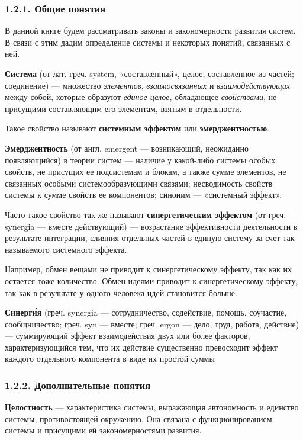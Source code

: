\documentclass[11pt,a4paper]{article}
\begin{document}
\subsubsection*{1.2.1. Общие понятия}

В данной книге будем рассматривать законы и закономерности развития систем. В
связи с этим дадим определение системы и некоторых понятий, связанных с ней.

\textbf{Система} (от лат. греч. system, «составленный», целое, составленное из
частей; соединение) — множество \emph{элементов}, \emph{взаимосвязанных} и
\emph{взаимодействующих} между собой, которые образуют \emph{единое целое},
обладающее \emph{свойствами}, не присущими составляющим его элементам, взятым
в отдельности.

Такое свойство называют \textbf{системным эффектом} или
\textbf{эмерджентностью}.

\textbf{Эмерджентность} (от англ. emergent — возникающий, неожиданно
появляющийся) в теории систем — наличие у какой-либо системы особых свойств,
не присущих ее подсистемам и блокам, а также сумме элементов, не связанных
особыми системообразующими связями; несводимость свойств системы к сумме
свойств ее компонентов; синоним — «системный эффект».

Часто такое свойство так же называют \textbf{синергетическим эффектом} (от
греч. synergia — вместе действующий) — возрастание эффективности деятельности
в результате интеграции, слияния отдельных частей в единую систему за счет так
называемого системного эффекта.

Например, обмен вещами не приводит к синергетическому эффекту, так как их
остается тоже количество. Обмен идеями приводит к синергетическому эффекту,
так как в результате у одного человека идей становится больше.

\textbf{Синерг\'{и}я} (греч. synergia — сотрудничество, содействие, помощь,
соучастие, сообщничество; греч. syn — вместе; греч. ergon — дело, труд,
работа, действие) — суммирующий эффект взаимодействия двух или более факторов,
характеризующийся тем, что их действие существенно превосходит эффект каждого
отдельного компонента в виде их простой суммы

\subsubsection*{1.2.2. Дополнительные понятия}

\textbf{Целостность} — характеристика системы, выражающая автономность и
единство системы, противостоящей окружению. Она связана с функционированием
системы и присущими ей закономерностями развития.
\end{document}
